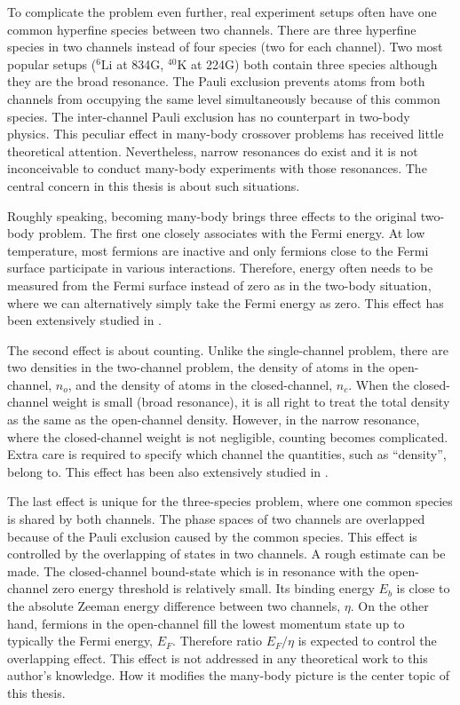 To complicate the problem even further,  real experiment setups often have one common hyperfine species between two channels. There are three hyperfine species in two channels instead of four species (two for each channel).  Two most popular setups (${}^{6}\text{Li}$ at 834G, $^{40}\text{K}$ at 224G) both contain three species although they are the broad resonance.  The Pauli exclusion prevents  atoms from both channels from occupying the same level simultaneously because of this common species.  The inter-channel Pauli exclusion has no counterpart in two-body physics. This peculiar effect  in many-body crossover problems has  received little theoretical attention.    Nevertheless,   narrow resonances do exist \cite{ChinRMP} and it is not  inconceivable to conduct many-body experiments with those resonances.  The central concern in this thesis is about such situations. 

Roughly speaking, becoming many-body brings three effects to the original two-body problem.  The first one closely associates with the Fermi energy.  At low temperature, most fermions are inactive and only fermions close to the Fermi surface participate in various interactions. Therefore, energy often needs to be measured from the Fermi surface instead of zero as in the two-body situation, where we can alternatively simply take the Fermi energy as zero.  This effect has been extensively studied in \cite{GurarieNarrow}.

The second effect is about counting. Unlike the single-channel problem, there are two densities in the two-channel problem, the density of atoms in the open-channel, $n_{o}$, and the density of atoms in the closed-channel, $n_{c}$. When the closed-channel weight is small (broad resonance), it is all right to treat the total density as the same as the open-channel density.  However, in the narrow resonance, where the closed-channel weight is not negligible, counting becomes complicated.  Extra care is required to specify which channel the  quantities, such as ``density'', belong to.  This effect has been  also extensively studied in \cite{GurarieNarrow}.

The last effect is unique for the three-species problem, where one common species is shared by both channels.  The phase spaces of two channels are overlapped because of the Pauli exclusion caused by the common species. This effect is controlled by the overlapping of states in two channels. A rough estimate can be made.  The closed-channel bound-state which is in resonance with the open-channel zero energy threshold is relatively small.  Its binding energy $E_b$ is close to the absolute Zeeman energy difference between two channels, $\eta$.  On the other hand, fermions in the open-channel fill the lowest  momentum state up to typically the Fermi energy, $E_F$.  Therefore ratio $E_F/\eta$ is expected to control the overlapping effect. This effect is not addressed in any theoretical work to this author's knowledge.  How it modifies the many-body picture is the center topic of this thesis. 

